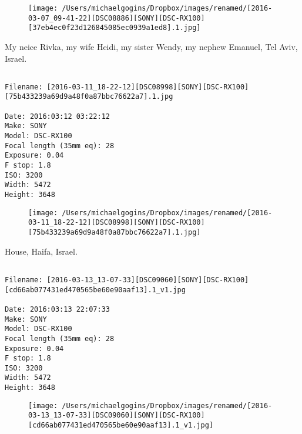 \documentclass[11pt,letter,DIV=14,paper=landscape]{scrbook}
\begin{document}
\begin{figure}
\texttt{[image: /Users/michaelgogins/Dropbox/images/renamed/[2016-03-07\_09-41-22][DSC08886][SONY][DSC-RX100][37eb4ec0f23d126845085ec0939a1ed8].1.jpg]}
\end{figure}
    
\clearpage
\noindent My neice Rivka, my wife Heidi, my sister Wendy, my nephew Emanuel, Tel Aviv, Israel.
\noindent
\begin{lstlisting}

Filename: [2016-03-11_18-22-12][DSC08998][SONY][DSC-RX100][75b433239a69d9a48f0a87bbc76622a7].1.jpg

Date: 2016:03:12 03:22:12
Make: SONY
Model: DSC-RX100
Focal length (35mm eq): 28
Exposure: 0.04
F stop: 1.8
ISO: 3200
Width: 5472
Height: 3648
\end{lstlisting}
\clearpage

\begin{figure}
\texttt{[image: /Users/michaelgogins/Dropbox/images/renamed/[2016-03-11\_18-22-12][DSC08998][SONY][DSC-RX100][75b433239a69d9a48f0a87bbc76622a7].1.jpg]}
\end{figure}
    
\clearpage
\noindent House, Haifa, Israel.
\noindent
\begin{lstlisting}

Filename: [2016-03-13_13-07-33][DSC09060][SONY][DSC-RX100][cd66ab077431ed470565be60e90aaf13].1_v1.jpg

Date: 2016:03:13 22:07:33
Make: SONY
Model: DSC-RX100
Focal length (35mm eq): 28
Exposure: 0.04
F stop: 1.8
ISO: 3200
Width: 5472
Height: 3648
\end{lstlisting}
\clearpage

\begin{figure}
\texttt{[image: /Users/michaelgogins/Dropbox/images/renamed/[2016-03-13\_13-07-33][DSC09060][SONY][DSC-RX100][cd66ab077431ed470565be60e90aaf13].1\_v1.jpg]}
\end{figure}
    
\end{document}

